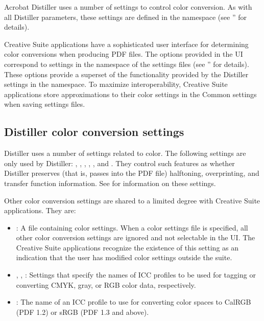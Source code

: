 \documentclass[letterpaper,12pt,english,openany,oneside]{sphinxmanual}
\begin{document}
Acrobat Distiller uses a number of settings to control color conversion. As with all Distiller parameters, these settings are defined in the  namespace (see ” for details).

Creative Suite applications have a sophisticated user interface for determining color conversions when producing PDF files. The options provided in the UI correspond to settings in the  namespace of the settings files (see ” for details). These options provide a superset of the functionality provided by the Distiller settings in the  namespace. To maximize interoperability, Creative Suite applications store approximations to their color settings in the Common settings when saving settings files.


\subsection{Distiller color conversion settings}
\label{\detokenize{PDF_Create_UsingSettings:distiller-color-conversion-settings}}
Distiller uses a number of settings related to color. The following settings are only used by Distiller:  ,  ,  ,  ,  , and  . They control such features as whether Distiller preserves (that is, passes into the PDF file) halftoning, overprinting, and transfer function information. See  for information on these settings.

Other color conversion settings are shared to a limited degree with Creative Suite applications. They are:
\begin{itemize}
\item {} 
 : A file containing color settings. When a color settings file is specified, all other color conversion settings are ignored and not selectable in the UI. The Creative Suite applications recognize the existence of this setting as an indication that the user has modified color settings outside the suite.

\item {} 
 ,  ,  : Settings that specify the names of ICC profiles to be used for tagging or converting CMYK, gray, or RGB color data, respectively.

\item {} 
 : The name of an ICC profile to use for converting color spaces to CalRGB (PDF 1.2) or sRGB (PDF 1.3 and above).

\end{itemize}
\end{document}
